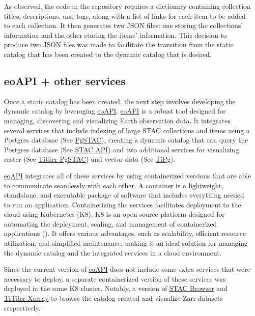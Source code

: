 \documentclass[
  oneside,
  open=any]{scrbook}
\begin{document}
As observed, the code in the repository requires a dictionary containing
collection titles, descriptions, and tags, along with a list of links
for each item to be added to each collection. It then generates two JSON
files: one storing the collections' information and the other storing
the items' information. This decision to produce two JSON files was made
to facilitate the transition from the static catalog that has been
created to the dynamic catalog that is desired.

\subsection{eoAPI + other services}\label{eoapi-other-services}

Once a static catalog has been created, the next step involves
developing the dynamic catalog by leveraging
\href{https://eoapi.dev/}{eoAPI}. \href{https://eoapi.dev/}{eoAPI} is a
robust tool designed for managing, discovering and visualizing Earth
observation data. It integrates several services that include indexing
of large STAC collections and items using a Postgres database (See
\href{https://github.com/stac-utils/pgstac}{PgSTAC}), creating a dynamic
catalog that can query the Postgres database (See
\href{https://github.com/stac-utils/stac-fastapi}{STAC API}) and two
additional services for visualizing raster (See
\href{https://github.com/stac-utils/titiler-pgstac}{Titiler-PgSTAC}) and
vector data (See \href{https://github.com/developmentseed/tipg}{TiPg}).

\href{https://eoapi.dev/}{eoAPI} integrates all of these services by
using containerized versions that are able to communicate seamlessly
with each other. A container is a lightweight, standalone, and
executable package of software that includes everything needed to run an
application. Containerizing the services facilitates deployment to the
cloud using Kubernetes (K8). K8 is an open-source platform designed for
automating the deployment, scaling, and management of containerized
applications (). It
offers various advantages, such as scalability, efficient resource
utilization, and simplified maintenance, making it an ideal solution for
managing the dynamic catalog and the integrated services in a cloud
environment.

Since the current version of \href{https://eoapi.dev/}{eoAPI} does not
include some extra services that were necessary to deploy, a separate
containerized version of these services was deployed in the same K8
cluster. Notably, a version of
\href{https://github.com/radiantearth/stac-browser}{STAC Browser} and
\href{https://github.com/developmentseed/titiler-xarray}{TiTiler-Xarray}
to browse the catalog created and visualize Zarr datasets respectively.
\end{document}
